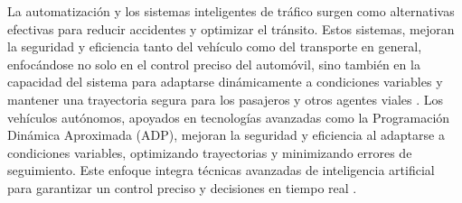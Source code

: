 \documentclass[lettersize, journal]{IEEEtran}
\begin{document}
La automatización y los sistemas inteligentes de tráfico surgen como alternativas efectivas para reducir accidentes y optimizar el tránsito. Estos sistemas, mejoran la seguridad y eficiencia tanto del vehículo como del transporte en general, enfocándose no solo en el control preciso del automóvil, sino también en la capacidad del sistema para adaptarse dinámicamente a condiciones variables y mantener una trayectoria segura para los pasajeros y otros agentes viales \cite{arshad2020clothoid}. Los vehículos autónomos, apoyados en tecnologías avanzadas como la Programación Dinámica Aproximada (ADP), mejoran la seguridad y eficiencia al adaptarse a condiciones variables, optimizando trayectorias y minimizando errores de seguimiento. Este enfoque integra técnicas avanzadas de inteligencia artificial para garantizar un control preciso y decisiones en tiempo real  \cite{ADP_A}.
\end{document}
